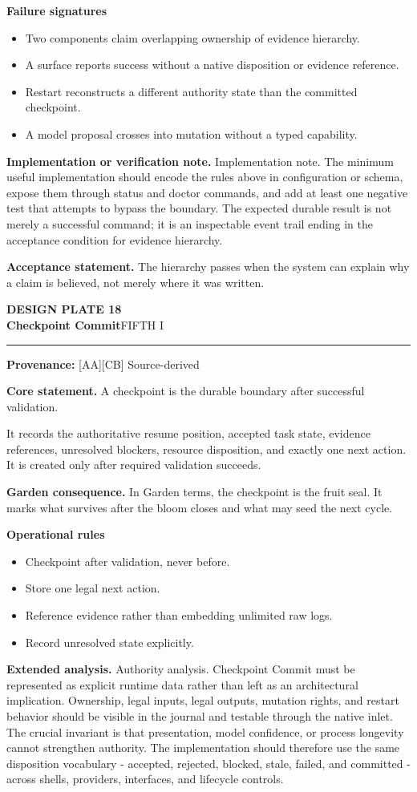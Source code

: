 \documentclass[10pt,letterpaper,oneside]{article}
\newcommand{\prov}[1]{\textcolor{gardenBlue}{\sffamily\footnotesize\textbf{Provenance:} #1}}
\newcommand{\platetitle}[3]{%
  \begin{minipage}[t][0.54in][t]{\textwidth}
  {\sffamily\bfseries\color{gardenDeep}\fontsize{9}{10}\selectfont DESIGN PLATE #1}\\[-1pt]
  {\sffamily\bfseries\color{gardenInk}\fontsize{16.5}{18}\selectfont #2}\hfill{\sffamily\color{gardenGreen}\large #3}
  \end{minipage}\vspace{-2pt}\hrule\vspace{5pt}}
\begin{document}
\textbf{Failure signatures}
\begin{itemize}
\item Two components claim overlapping ownership of evidence hierarchy.
\item A surface reports success without a native disposition or evidence reference.
\item Restart reconstructs a different authority state than the committed checkpoint.
\item A model proposal crosses into mutation without a typed capability.
\end{itemize}
\textbf{Implementation or verification note.} Implementation note. The minimum useful implementation should encode the rules above in configuration or schema, expose them through status and doctor commands, and add at least one negative test that attempts to bypass the boundary. The expected durable result is not merely a successful command; it is an inspectable event trail ending in the acceptance condition for evidence hierarchy.

\begin{acceptbox}
\textbf{Acceptance statement.} The hierarchy passes when the system can explain why a claim is believed, not merely where it was written.
\end{acceptbox}
\newpage
\platetitle{18}{Checkpoint Commit}{FIFTH I}
\prov{[AA][CB] Source-derived}
\fontsize{8.85}{10.45}\selectfont
\begin{corebox}
\textbf{Core statement.} A checkpoint is the durable boundary after successful validation.
\end{corebox}
It records the authoritative resume position, accepted task state, evidence references, unresolved blockers, resource disposition, and exactly one next action. It is created only after required validation succeeds.

\textbf{Garden consequence.} In Garden terms, the checkpoint is the fruit seal. It marks what survives after the bloom closes and what may seed the next cycle.

\textbf{Operational rules}
\begin{itemize}
\item Checkpoint after validation, never before.
\item Store one legal next action.
\item Reference evidence rather than embedding unlimited raw logs.
\item Record unresolved state explicitly.
\end{itemize}
\textbf{Extended analysis.} Authority analysis. Checkpoint Commit must be represented as explicit runtime data rather than left as an architectural implication. Ownership, legal inputs, legal outputs, mutation rights, and restart behavior should be visible in the journal and testable through the native inlet. The crucial invariant is that presentation, model confidence, or process longevity cannot strengthen authority. The implementation should therefore use the same disposition vocabulary - accepted, rejected, blocked, stale, failed, and committed - across shells, providers, interfaces, and lifecycle controls.
\end{document}

